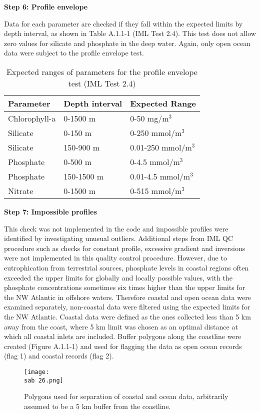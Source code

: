 \documentclass[letterpaper,portrait,11pt]{scrartcl}
\numberwithin{equation}{section}		%
\numberwithin{figure}{section}			%
\numberwithin{table}{section}				%
\newcommand{\ecomod}{\string~/ecomod_data/}   %
\newcommand{\sab}{\ecomod/mpa/sab/}   %
\begin{document}
\begin{appendices}
\textbf{Step 6: Profile envelope}

Data  for each parameter are checked if they fall within the expected limits by depth interval, as shown in Table A.1.1-1 (IML Test 2.4). This test does not allow zero values for silicate and phosphate in the deep water. Again, only open ocean data were subject to the profile envelope test.

\begin{table}[h]
\label{tableBioChemQC}
\caption{Expected ranges of parameters for the profile envelope test (IML Test 2.4)}
\begin{tabular}{lll}
Parameter & Depth interval & Expected Range \\
\hline
Chlorophyll-a & 0-1500 m & 0-50 mg/m$^{3}$ \\
Silicate & 0-150 m & 0-250 mmol/m$^{3}$ \\
Silicate & 150-900 m & 0.01-250 mmol/m$^{3}$ \\
Phosphate & 0-500 m & 0-4.5 mmol/m$^{3}$ \\
Phosphate & 150-1500 m & 0.01-4.5 mmol/m$^{3}$ \\
Nitrate & 0-1500 m & 0-515 mmol/m$^{3}$ \\
\end{tabular}
\end{table}


\textbf{Step 7: Impossible profiles}

This check was not implemented in the code and impossible profiles were identified by investigating unusual outliers.
Additional steps from IML QC procedure such as checks for constant profile, excessive gradient and inversions were not implemented in this quality control procedure. However, due to eutrophication from terrestrial sources, phosphate levels in coastal regions often exceeded the upper limits for globally and locally possible values, with the phosphate concentrations sometimes six times higher than the upper limits for the NW Atlantic in offshore waters. Therefore coastal and open ocean data were examined separately, non-coastal data were filtered using the expected limits for the NW Atlantic. Coastal data were defined as the ones collected less than 5 km away from the coast, where 5 km limit was chosen as an optimal distance at which all coastal inlets are included. Buffer polygons along the coastline were created (Figure A.1.1-1) and used for flagging the data as open ocean records (flag 1) and coastal records (flag 2).

\begin{figure}
  \centering
  \texttt{[image: \\sab 26.png]}
  \caption{Polygons used for separation of coastal and ocean data, arbitrarily assumed to be a 5 km buffer from the coastline.}
  \label{figA.1.1-1}
\end{figure}


\end{appendices}
\end{document}
